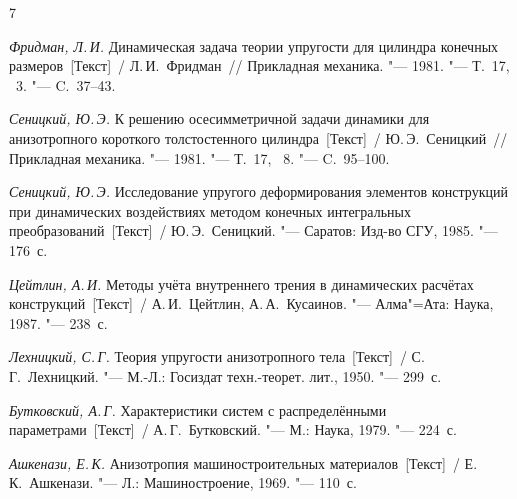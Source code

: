 \begin{thebibliography}{7}
\item \textit{Фридман, Л.\,И.} Динамическая задача теории упругости для цилиндра конечных размеров~[Текст]~/ Л.\,И.~Фридман~/\!/ Прикладная механика. "--- 1981. "--- Т.~17, \No~3. "--- C.~37--43.

\item \textit{Сеницкий, Ю.\,Э.} К решению осесимметричной задачи динамики для анизотропного короткого 
толстостенного цилиндра~[Текст]~/ Ю.\,Э.~Сеницкий~/\!/ Прикладная механика. "--- 1981. "--- 
Т.~17, \No~8. "--- C.~95--100.


\item \textit{Сеницкий, Ю.\,Э.} Исследование упругого деформирования элементов конструкций при динамических 
воздействиях методом конечных интегральных преобразований~[Текст]~/ Ю.\,Э.~Сеницкий. "---
Саратов: Изд-во СГУ, 1985. "--- 176~с.

\item \textit{Цейтлин, А.\,И.} Методы учёта внутреннего трения в динамических расчётах конструкций~[Текст]~/ А.\,И.~Цейтлин, А.\,А.~Кусаинов. "--- Алма"=Ата: Наука, 1987. "--- 238~с.

\item \textit{Лехницкий, С.\,Г.} Теория упругости анизотропного тела~[Текст]~/ С.\,Г.~Лехницкий. "--- М.-Л.: Госиздат 
техн.-теорет. лит., 1950. "--- 299~с.

\item \textit{Бутковский, А.\,Г.} Характеристики систем с распределёнными параметрами~[Текст]~/ А.\,Г.~Бутковский. "--- М.: Наука, 1979. "--- 224~с.

\item \textit{Ашкенази, Е.\,К.} Анизотропия машиностроительных материалов~[Текст]~/ Е.\,К.~Ашкенази. "--- Л.: 
Машиностроение, 1969. "--- 110~с.

\end{thebibliography}

\vspace{5mm}
  \lfoot[]{}
  \rfoot[]{}

\makeengtitle




%
